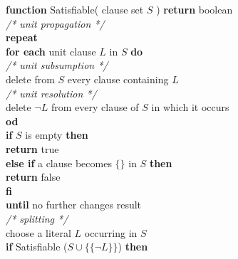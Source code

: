 \begin{listing}[ht]
  \textbf{function} Satisfiable( clause set $S$ ) \textbf{return} boolean\\
    \hspace*{0.5cm}
    \textit{/* unit propagation */}\\
    \hspace*{0.5cm}
    \textbf{repeat}\\
      \hspace*{1.0cm}
      \textbf{for each} unit clause $L$ in $S$ \textbf{do}\\
        \hspace*{1.5cm}
        \textit{/* unit subsumption */}\\
        \hspace*{1.5cm}
        delete from $S$ every clause containing $L$\\
        \hspace*{1.5cm}
        \textit{/* unit resolution */}\\
        \hspace*{1.5cm}
        delete $\neg L$ from every clause of $S$ in which it occurs\\
      \hspace*{1.0cm}
      \textbf{od}\\
      \hspace*{1.0cm}
      \textbf{if} $S$ is empty \textbf{then}\\
        \hspace*{1.5cm}
        \textbf{return} true\\
      \hspace*{1.0cm}
      \textbf{else if} a clause becomes $\{\}$ in $S$ \textbf{then}\\
        \hspace*{1.5cm}
        \textbf{return} false\\
      \hspace*{1.0cm}
      \textbf{fi}\\
    \hspace*{0.5cm}
    \textbf{until} no further changes result\\
    \hspace*{0.5cm}
    \textit{/* splitting */}\\
    \hspace*{0.5cm}
    choose a literal $L$ occurring in $S$\\
    \hspace*{0.5cm}
    \textbf{if} Satisfiable ($S \cup \{\{\neg L\}\}$) \textbf{then}\\

\end{listing}
